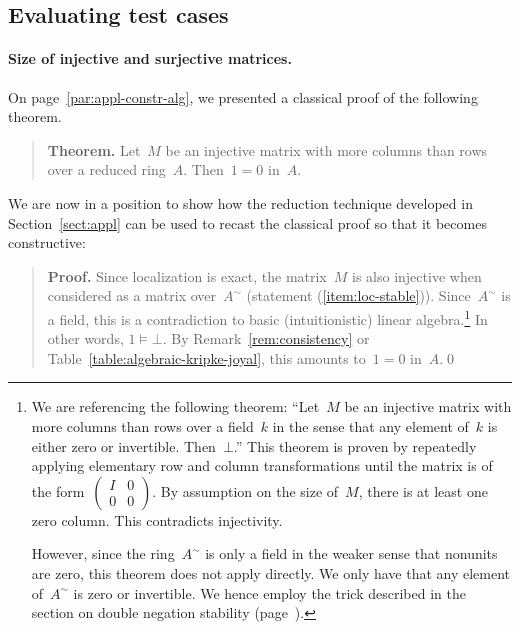 \documentclass{ws-rv9x6}
\begin{document}
{\subsection{Evaluating test cases}
\label{sect:example-applications}

\paragraph{Size of injective and surjective matrices.}

On page~\ref{par:appl-constr-alg}, we presented a classical proof of the
following theorem.\par
\begin{quote}
\textbf{Theorem.} Let~$M$ be an injective matrix with more columns than rows
over a reduced ring~$A$. Then~$1 = 0$ in~$A$.
\end{quote}
We are now in a position to show how the reduction technique developed in
Section~\ref{sect:appl} can be used to recast the classical proof so that it
becomes constructive:

\begin{quote}
\textbf{Proof.} Since localization is exact, the matrix~$M$ is also injective when
considered as a matrix over~$A^\sim$ (statement (\ref{item:loc-stable})).
Since~$A^\sim$ is a field, this is a contradiction to basic (intuitionistic)
linear algebra.\footnote{We are referencing the following theorem: ``Let~$M$ be
an injective matrix with more columns than rows over a field~$k$ in the sense
that any element of~$k$ is either zero or invertible. Then~$\bot$.'' This
theorem is proven by repeatedly applying elementary row and column
transformations until the matrix is of the
form~$\left(\begin{smallmatrix}I&0\\0&0\end{smallmatrix}\right)$. By assumption
on the size of~$M$, there is at least one zero column. This contradicts
injectivity.

However, since the ring~$A^\sim$ is only a field in the weaker sense that
nonunits are zero, this theorem does not apply directly. We only have that any
element of~$A^\sim$ is \notnot zero or invertible. We hence employ the
trick described in the section on double negation stability
(page~\pageref{par:double-negation-stability}).}
In other words, $1 \models \bot$. By
Remark~\ref{rem:consistency} or Table~\ref{table:algebraic-kripke-joyal}, this amounts to~$1 = 0$ in~$A$.\qed
\end{quote}

}
\end{document}
